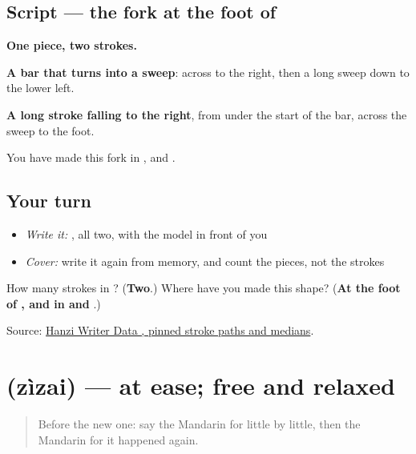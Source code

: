 \subsection*{Script — the fork at the foot of }

\begin{quote}
\end{quote}

\textbf{One piece, two strokes.}

\textbf{A bar that turns into a sweep}: across to the right, then a long sweep down to the lower left.

\textbf{A long stroke falling to the right}, from under the start of the bar, across the sweep to the foot.

You have made this fork in ,  and .

\subsection*{Your turn}
\begin{itemize}
\raggedright
  \item \emph{Write it:} , all two, with the model in front of you
  \item \emph{Cover:} write it again from memory, and count the pieces, not the strokes
\end{itemize}

\begin{tcolorbox}[breakable,colback=teal!4,colframe=teal!35!black,title={Before you move on}]
How many strokes in ? (\textbf{Two}.) Where have you made this shape? (\textbf{At the foot of , and in  and }.)

Source: \href{https://raw.githubusercontent.com/chanind/hanzi-writer-data/68d10a4b21150cae5e1ebbd223eed289cf32d90c/data/\%E5\%8F\%88.json}{Hanzi Writer Data , pinned stroke paths and medians}.
\end{tcolorbox}
\section[\texorpdfstring{\zh{自在} (zìzai)}{自在 (zìzai)}]{ (zìzai) — at ease; free and relaxed}

\label{lesson:ZH-C315-zizai}



\begin{quote}
Before the new one: say the Mandarin for little by little, then the Mandarin for it happened again.
\end{quote}

